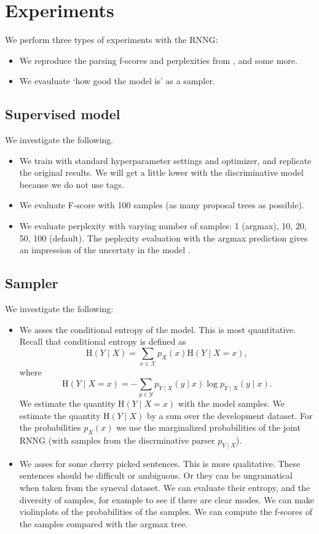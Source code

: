 \section{Experiments}
We perform three types of experiments with the RNNG:
\begin{itemize}
  \item We reproduce the parsing f-scores and perplexities from \citep{dyer2016rnng}, and some more.
  \item We evauluate `how good the model is' as a sampler.
\end{itemize}

\subsection{Supervised model} We investigate the following.
\begin{itemize}
  \item We train with standard hyperparameter settings and optimizer, and replicate the original results. We will get a little lower with the discriminative model because we do not use tags.
  \item We evaluate F-score with 100 samples (as many proposal trees as possible).
  \item We evaluate perplexity with varying number of samples: 1 (argmax), 10, 20, 50, 100 (default). The peplexity evaluation with the argmax prediction gives an impression of the uncertaty in the model \citep{buys2018exact}.
\end{itemize}

\subsection{Sampler} We investigate the following:
\begin{itemize}
  \item We asses the conditional entropy of the model. This is most quantitative. Recall that conditional entropy is defined as
  \begin{equation}
    \text{H}(Y \mid X) = \sum_{x \in \mathcal{X}} p_X(x)\text{H}(Y \mid X = x),
  \end{equation}
  where
  \begin{equation}
    \text{H}(Y \mid X = x) = - \sum_{y \in \mathcal{Y}} p_{Y \mid X}(y \mid x) \log p_{Y \mid X}(y \mid x).
  \end{equation}
  We estimate the quantity $\text{H}(Y \mid X = x)$ with the model samples. We estimate the quantity $\text{H}(Y \mid X)$ by a sum over the development dataset. For the probabilities $p_X(x)$ we use the marginalized probabilities of the joint RNNG (with samples from the discrminative parser $p_{Y \mid X}$).
  \item We asses for some cherry picked sentences. This is more qualitative. These sentences should be difficult or ambiguous. Or they can be ungramatical when taken from the syneval dataset. We can evaluate their entropy, and the diversity of samples, for example to see if there are clear modes. We can make violinplots of the probabilities of the samples. We can compute the f-scores of the samples compared with the argmax tree.
\end{itemize}

